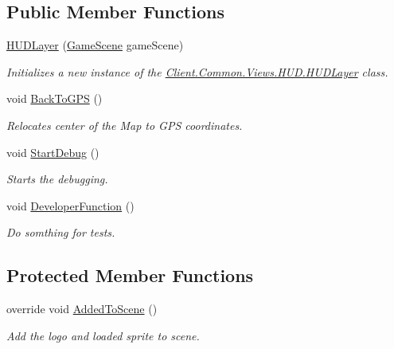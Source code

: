\subsection*{Public Member Functions}
\begin{DoxyCompactItemize}
\item 
\hyperlink{classClient_1_1Common_1_1Views_1_1HUD_1_1HUDLayer_a9ca470a87d1f400d9d65a36568894224}{H\+U\+D\+Layer} (\hyperlink{classClient_1_1Common_1_1Views_1_1GameScene}{Game\+Scene} game\+Scene)
\begin{DoxyCompactList}\small\item\em Initializes a new instance of the \hyperlink{classClient_1_1Common_1_1Views_1_1HUD_1_1HUDLayer}{Client.\+Common.\+Views.\+H\+U\+D.\+H\+U\+D\+Layer} class. \end{DoxyCompactList}\item 
void \hyperlink{classClient_1_1Common_1_1Views_1_1HUD_1_1HUDLayer_ac53155dd6c5332587b37e3c70c2e5bc8}{Back\+To\+G\+P\+S} ()
\begin{DoxyCompactList}\small\item\em Relocates center of the Map to G\+P\+S coordinates. \end{DoxyCompactList}\item 
void \hyperlink{classClient_1_1Common_1_1Views_1_1HUD_1_1HUDLayer_a969b6fcb1ff77c7701d0813f0ee1e93b}{Start\+Debug} ()
\begin{DoxyCompactList}\small\item\em Starts the debugging. \end{DoxyCompactList}\item 
void \hyperlink{classClient_1_1Common_1_1Views_1_1HUD_1_1HUDLayer_a685f6c89b53b83262c56647eeb6f578d}{Developer\+Function} ()
\begin{DoxyCompactList}\small\item\em Do somthing for tests. \end{DoxyCompactList}\end{DoxyCompactItemize}
\subsection*{Protected Member Functions}
\begin{DoxyCompactItemize}
\item 
override void \hyperlink{classClient_1_1Common_1_1Views_1_1HUD_1_1HUDLayer_a2654403c43e74e45f5cff2d6717e2222}{Added\+To\+Scene} ()
\begin{DoxyCompactList}\small\item\em Add the logo and loaded sprite to scene. \end{DoxyCompactList}\end{DoxyCompactItemize}


